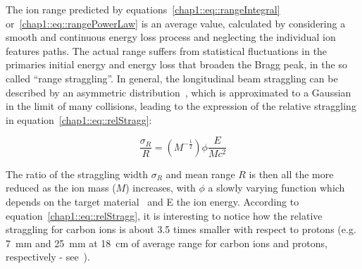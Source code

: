 The ion range predicted by equations~\ref{chap1::eq::rangeIntegral} or~\ref{chap1::eq::rangePowerLaw} is an average value, calculated by considering a smooth and continuous energy loss process and neglecting the individual ion features paths. The actual range suffers from statistical fluctuations in the primaries initial energy and energy loss that broaden the Bragg peak, in the so called \enquote{range straggling}. In general, the longitudinal beam straggling can be described by an asymmetric distribution~\parencite{Vavilov1957}, which is approximated to a Gaussian in the limit of many collisions, leading to the expression of the relative straggling in equation~\ref{chap1::eq::relStragg}:
 
 \begin{equation}
\frac{\sigma_{R}}{R} = (M^{-\frac{1}{2}})\phi\frac{E}{Mc^{2}}
\label{chap1::eq::relStragg}
\end{equation}

The ratio of the straggling width $\sigma_{R}$ and mean range $R$ is then all the more reduced as the ion mass ($M$) increases, with $\phi$ a slowly varying function which depends on the target material~\parencite{Rossi1952} and E the ion energy. According to equation~\ref{chap1::eq::relStragg}, it is interesting to notice how the relative straggling for carbon ions is about 3.5 times smaller with respect to protons (e.g. 7~mm and 25~mm at 18~cm of average range for carbon ions and protons, respectively - see~\cite{Durante2016}).

